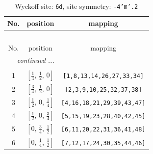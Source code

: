 \documentclass[fleqn,8pt]{jsarticle}
\begin{document}
\begin{longtable}{ccc}
\caption{Wyckoff site: {\tt 6d}, site symmetry: {\tt -4'm'.2}}
 \\
 \hline \hline
No. & position & mapping \\ \hline \endfirsthead

\multicolumn{2}{l}{\tablename\ \thetable{}} \\
 \hline \hline
No. & position & mapping \\ \hline \endhead

 \hline \hline
\multicolumn{2}{r}{\footnotesize\it continued ...} \\ \endfoot

 \hline \hline
\multicolumn{2}{r}{} \\ \endlastfoot

1 & $\left[ \frac{1}{4},\, \frac{1}{2},\, 0 \right]$ & {\tt [1,8,13,14,26,27,33,34]} \\ \hline
2 & $\left[ \frac{3}{4},\, \frac{1}{2},\, 0 \right]$ & {\tt [2,3,9,10,25,32,37,38]} \\ \hline
3 & $\left[ \frac{1}{2},\, 0,\, \frac{1}{4} \right]$ & {\tt [4,16,18,21,29,39,43,47]} \\ \hline
4 & $\left[ \frac{1}{2},\, 0,\, \frac{3}{4} \right]$ & {\tt [5,15,19,23,28,40,42,45]} \\ \hline
5 & $\left[ 0,\, \frac{3}{4},\, \frac{1}{2} \right]$ & {\tt [6,11,20,22,31,36,41,48]} \\ \hline
6 & $\left[ 0,\, \frac{1}{4},\, \frac{1}{2} \right]$ & {\tt [7,12,17,24,30,35,44,46]} \\
\end{longtable}
\renewcommand{\arraystretch}{1.2}
\end{document}
